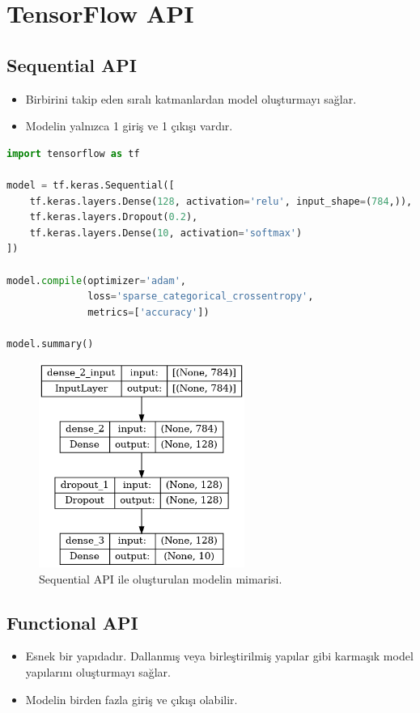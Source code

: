 \section{TensorFlow API}
\subsection{Sequential API}
\begin{itemize}
    \item Birbirini takip eden sıralı katmanlardan model oluşturmayı sağlar.
    \item Modelin yalnızca 1 giriş ve 1 çıkışı vardır.
\end{itemize}

\begin{lstlisting}[language=Python]
import tensorflow as tf

model = tf.keras.Sequential([
    tf.keras.layers.Dense(128, activation='relu', input_shape=(784,)),
    tf.keras.layers.Dropout(0.2),
    tf.keras.layers.Dense(10, activation='softmax')
])

model.compile(optimizer='adam',
              loss='sparse_categorical_crossentropy',
              metrics=['accuracy'])

model.summary()
\end{lstlisting}

\begin{figure}[ht]
    \centering
    \includegraphics[width=0.6\textwidth]{images/sequential_model.png}
    \caption{Sequential API ile oluşturulan modelin mimarisi.}
    \label{fig:enter-label}
\end{figure}

\newpage

\subsection{Functional API}
\begin{itemize}
    \item Esnek bir yapıdadır. Dallanmış veya birleştirilmiş yapılar gibi karmaşık model yapılarını oluşturmayı sağlar.
    \item Modelin birden fazla giriş ve çıkışı olabilir.
\end{itemize}

